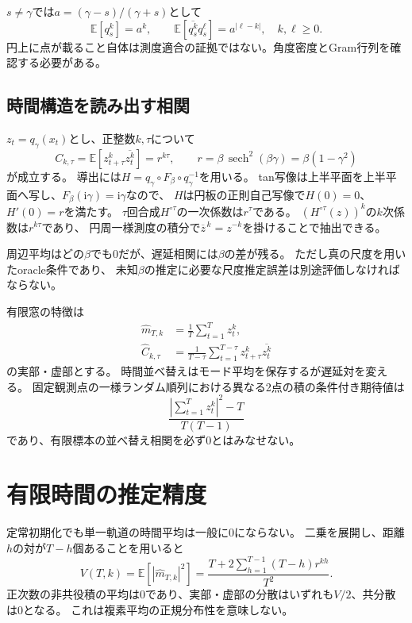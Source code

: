 \documentclass[a4paper,11pt]{jlreq}
\newcommand{\ii}{\mathrm{i}}
\newcommand{\E}{\mathbb{E}}
\begin{document}
$s\ne\gamma$では$a=(\gamma-s)/(\gamma+s)$として
\begin{equation}
\E[q_s^k]=a^k,\qquad
\E[\overline{q_s^k}q_s^\ell]=a^{|\ell-k|},\quad k,\ell\ge0.
\end{equation}
円上に点が載ること自体は測度適合の証拠ではない。角度密度とGram行列を確認する必要がある。

\subsection{時間構造を読み出す相関}
$z_t=q_\gamma(x_t)$とし、正整数$k,\tau$について
\begin{equation}
C_{k,\tau}=\E[z_{t+\tau}^k\overline{z_t^k}]
=r^{k\tau},\qquad
r=\beta\,\operatorname{sech}^2(\beta\gamma)=\beta(1-\gamma^2)
\label{eq:corr}
\end{equation}
が成立する\cite{e1}。
導出には$H=q_\gamma\circ F_\beta\circ q_\gamma^{-1}$を用いる。
tan写像は上半平面を上半平面へ写し、$F_\beta(\ii\gamma)=\ii\gamma$なので、
$H$は円板の正則自己写像で$H(0)=0$、$H'(0)=r$を満たす。
$\tau$回合成$H^{\circ\tau}$の一次係数は$r^\tau$である。
$(H^{\circ\tau}(z))^k$の$k$次係数は$r^{k\tau}$であり、
円周一様測度の積分で$\overline z^{\,k}=z^{-k}$を掛けることで抽出できる。

周辺平均はどの$\beta$でも0だが、遅延相関には$\beta$の差が残る。
ただし真の尺度を用いたoracle条件であり、
未知$\beta$の推定に必要な尺度推定誤差は別途評価しなければならない。

有限窓の特徴は
\begin{align}
\widehat m_{T,k}&=\frac1T\sum_{t=1}^Tz_t^k,\\
\widehat C_{k,\tau}
&=\frac1{T-\tau}\sum_{t=1}^{T-\tau}
 z_{t+\tau}^k\overline{z_t^k}
\end{align}
の実部・虚部とする。
時間並べ替えはモード平均を保存するが遅延対を変える。
固定観測点の一様ランダム順列における異なる2点の積の条件付き期待値は
\begin{equation}
\frac{|\sum_{t=1}^T z_t^k|^2-T}{T(T-1)}
\end{equation}
であり、有限標本の並べ替え相関を必ず0とはみなせない。

\section{有限時間の推定精度}
定常初期化でも単一軌道の時間平均は一般に0にならない。
二乗を展開し、距離$h$の対が$T-h$個あることを用いると
\begin{equation}
V(T,k)=\E[|\widehat m_{T,k}|^2]
=\frac{T+2\sum_{h=1}^{T-1}(T-h)r^{kh}}{T^2}.
\label{eq:variance}
\end{equation}
正次数の非共役積の平均は0であり、実部・虚部の分散はいずれも$V/2$、共分散は0となる。
これは複素平均の正規分布性を意味しない。
\end{document}
